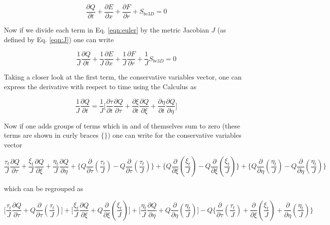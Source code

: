 \begin{equation}
	\frac{\partial Q}{\partial t} + \frac{\partial E}{\partial x} + \frac{\partial F}{\partial r} + S_{be3D} = 0
\label{eqn:euler}
\end{equation}

	Now if we divide each term in Eq. \ref{eqn:euler} by the metric Jacobian $J$ (as defined by Eq. \ref{eqn:J}) 
one can write

\begin{displaymath}
	\frac{1}{J}\frac{\partial Q}{\partial t} + \frac{1}{J}\frac{\partial E}{\partial x} 
	+ \frac{1}{J}\frac{\partial F}{\partial r} + \frac{1}{J}S_{be3D} = 0
\end{displaymath}

	Taking a closer look at the first term, the conservative variables vector, one can express the 
derivative with respect to time using the Calculus as

\begin{displaymath}
	\frac{1}{J}\frac{\partial Q}{\partial t} = \frac{1}{J}\Big[\frac{\partial \tau}{\partial t}
	\frac{\partial Q}{\partial \tau} + \frac{\partial \xi}{\partial t}
	\frac{\partial Q}{\partial \xi} + \frac{\partial \eta}{\partial t} \frac{\partial Q}{\partial \eta}\Big]
\end{displaymath}

	Now if one adds groups of terms which in and of themselves sum to zero (these terms are shown in curly braces $\{\}$) 
one can write for the conservative variables vector 

\begin{displaymath}
	\frac{\tau_t}{J}\frac{\partial Q}{\partial \tau} + 
	\frac{\xi_t}{J} \frac{\partial Q}{\partial \xi} + \frac{\eta_t}{J} \frac{\partial Q}{\partial \eta}
	+ \{ Q\frac{\partial}{\partial \tau}(\frac{\tau_t}{J}) - Q\frac{\partial}{\partial \tau}(\frac{\tau_t}{J}) \}
	+ \{ Q\frac{\partial}{\partial \xi}(\frac{\xi_t}{J}) - Q\frac{\partial}{\partial \xi}(\frac{\xi_t}{J}) \}
	+ \{ Q\frac{\partial}{\partial \eta}(\frac{\eta_t}{J}) - Q\frac{\partial}{\partial \eta}(\frac{\eta_t}{J}) \}
\end{displaymath}

	which can be regrouped as

\begin{equation}
	\Big[\frac{\tau_t}{J}\frac{\partial Q}{\partial \tau} + Q\frac{\partial}{\partial \tau}(\frac{\tau_t}{J})\Big] +
	\Big[\frac{\xi_t}{J}\frac{\partial Q}{\partial \xi} + Q\frac{\partial}{\partial \xi}(\frac{\xi_t}{J})\Big] + 
	\Big[\frac{\eta_t}{J}\frac{\partial Q}{\partial \eta} + Q\frac{\partial}{\partial \eta}(\frac{\eta_t}{J})\Big]
	-Q \Big\{\frac{\partial}{\partial \tau}(\frac{\tau_t}{J}) + \frac{\partial}{\partial \xi}(\frac{\xi_t}{J})
	+ \frac{\partial}{\partial \eta}(\frac{\eta_t}{J}) \Big\}
\label{eqn:Qbig}
\end{equation}


